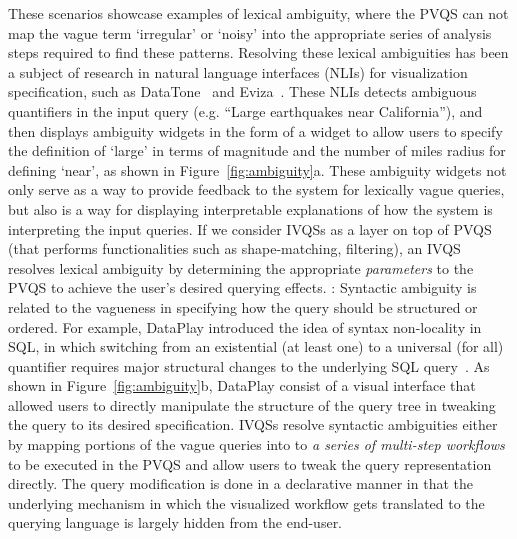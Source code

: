These scenarios showcase examples of lexical ambiguity, where the PVQS can not map the vague term `irregular' or `noisy' into the appropriate series of analysis steps required to find these patterns. Resolving these lexical ambiguities has been a subject of research in natural language interfaces (NLIs) for visualization specification, such as DataTone~\cite{Gao2015} and Eviza~\cite{Setlur2016}. These NLIs detects ambiguous quantifiers in the input query (e.g. ``Large earthquakes near California''), and then displays ambiguity widgets in the form of a widget to allow users to specify the definition of `large' in terms of magnitude and the number of miles radius for defining `near', as shown in Figure~\ref{fig:ambiguity}a. These ambiguity widgets not only serve as a way to provide feedback to the system for lexically vague queries, but also is a way for displaying interpretable explanations of how the system is interpreting the input queries. If we consider IVQSs as a layer on top of PVQS (that performs functionalities such as shape-matching, filtering), an IVQS resolves lexical ambiguity by determining the appropriate \textit{parameters} to the PVQS to achieve the user's desired querying effects.
: Syntactic ambiguity is related to the vagueness in specifying how the query should be structured or ordered. For example, DataPlay introduced the idea of syntax non-locality in SQL, in which switching from an existential (at least one) to a universal (for all) quantifier requires major structural changes to the underlying SQL query~\cite{Abouzied2012}. As shown in Figure~\ref{fig:ambiguity}b, DataPlay consist of a visual interface that allowed users to directly manipulate the structure of the query tree in tweaking the query to its desired specification. IVQSs resolve syntactic ambiguities either by mapping portions of the vague queries into to \textit{a series of multi-step workflows} to be executed in the PVQS and allow users to tweak the query representation directly. The query modification is done in a declarative manner in that the underlying mechanism in which the visualized workflow gets translated to the querying language is largely hidden from the end-user. 
